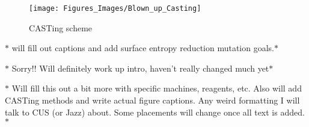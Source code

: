 \documentclass[12pt,twoside]{reedthesis}
\begin{document}
		 	\begin{figure}[h]
		 		
		 		\centering
		 		\texttt{[image: Figures\_Images/Blown\_up\_Casting]}
		 		\caption[Binding Reaction and Immunoprecipitation Scheme ]{CASTing scheme}
		 		\label{CASTingScheme}
		 	\end{figure}
		 	
		 	$*$ will fill out captions and add surface entropy reduction mutation goals.$*$
		 	
		 	
		 	$*$ Sorry!! Will definitely work up intro, haven't really changed much yet$*$
		 	
		 

    
    $*$ Will fill this out a bit more with specific machines, reagents, etc. Also will add CASTing methods and write actual figure captions. Any weird formatting I will talk to CUS (or Jazz) about. Some placements will change once all text is added.$*$
\end{document}
